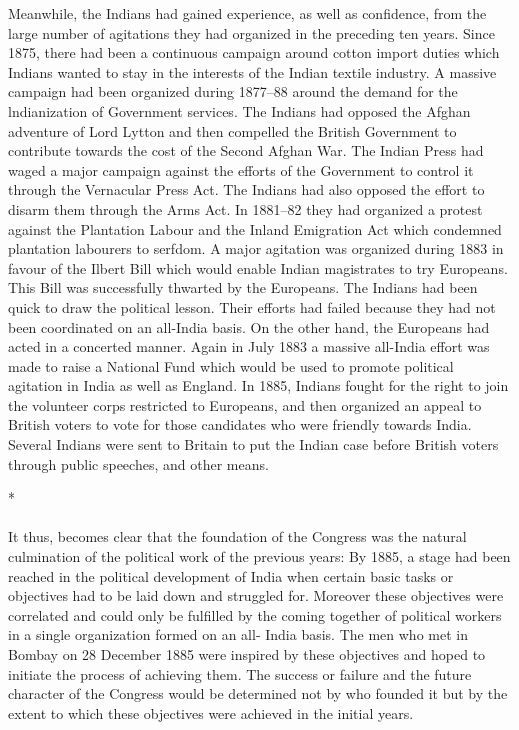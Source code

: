 Meanwhile, the Indians had gained experience, as well as confidence, from the large number of agitations they had organized in the preceding ten years. Since 1875, there had been a continuous campaign around cotton import duties which Indians wanted to stay in the interests of the Indian textile industry. A massive campaign had been organized during 1877--88 around the demand for the lndianization of Government services. The Indians had opposed the Afghan adventure of Lord Lytton and then compelled the British Government to contribute towards the cost of the Second Afghan War. The Indian Press had waged a major campaign against the efforts of the Government to control it through the Vernacular Press Act. The Indians had also opposed the effort to disarm them through the Arms Act. In 1881--82 they had organized a protest against the Plantation Labour and the Inland Emigration Act which condemned plantation labourers to serfdom. A major agitation was organized during 1883 in favour of the Ilbert Bill which would enable Indian magistrates to try Europeans. This Bill was successfully thwarted by the Europeans. The Indians had been quick to draw the political lesson. Their efforts had failed because they had not been coordinated on an all-India basis. On the other hand, the Europeans had acted in a concerted manner. Again in July 1883 a massive all-India effort was made to raise a National Fund which would be used to promote political agitation in India as well as England. In 1885, Indians fought for the right to join the volunteer corps restricted to Europeans, and then organized an appeal to British voters to vote for those candidates who were friendly towards India. Several Indians were sent to Britain to put the Indian case before British voters through public speeches, and other means.

\begin{center}*\end{center}

\paragraph*{}

It thus, becomes clear that the foundation of the Congress was the natural culmination of the political work of the previous years: By 1885, a stage had been reached in the political development of India when certain basic tasks or objectives had to be laid down and struggled for. Moreover these objectives were correlated and could only be fulfilled by the coming together of political workers in a single organization formed on an all- India basis. The men who met in Bombay on 28 December 1885 were inspired by these objectives and hoped to initiate the process of achieving them. The success or failure and the future character of the Congress would be determined not by who founded it but by the extent to which these objectives were achieved in the initial years.

